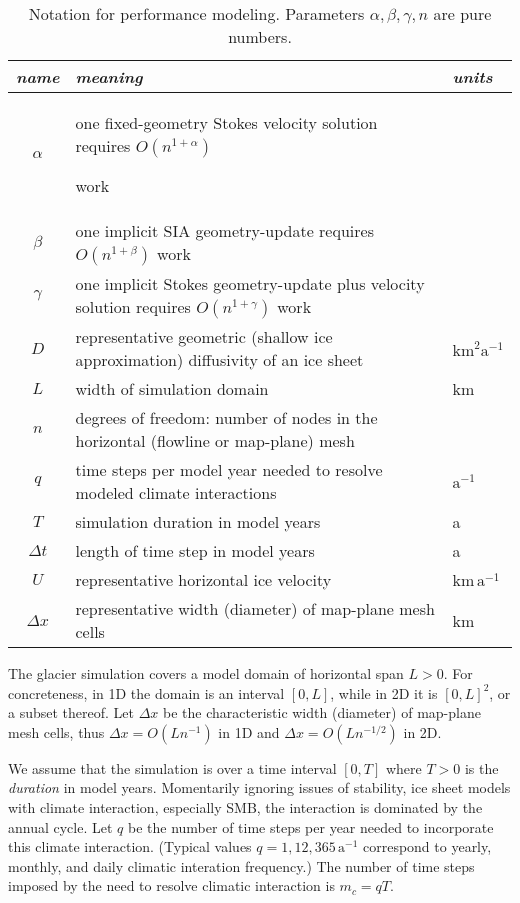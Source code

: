 \documentclass[twocolumn,letterpaper]{igs}
\begin{document}
\begin{table*}[ht]
\begin{tabular}{cll}
\emph{name} & \emph{meaning} & \emph{units} \\ \hline
$\alpha$    & one fixed-geometry Stokes velocity solution requires $O(n^{1+\alpha})${\large \strut} work\\
$\beta$     & one implicit SIA geometry-update requires $O(n^{1+\beta})$ work \\
$\gamma$    & one implicit Stokes geometry-update plus velocity solution requires $O(n^{1+\gamma})$ work \\
$D$         & representative geometric (shallow ice approximation) diffusivity of an ice sheet & $\text{km}^2 \text{a}^{-1}$ \\
$L$         & width of simulation domain & km \\
$n$         & degrees of freedom: number of nodes in the horizontal (flowline or map-plane) mesh \\
$q$         & time steps per model year needed to resolve modeled climate interactions & $\text{a}^{-1}$ \\
$T$         & simulation duration in model years & a \\
$\Delta t$  & length of time step in model years & a \\
$U$         & representative horizontal ice velocity & $\text{km}\,\text{a}^{-1}$ \\
$\Delta x$  & representative width (diameter) of map-plane mesh cells & km
\end{tabular}
\caption{Notation for performance modeling.  Parameters $\alpha,\beta,\gamma,n$ are pure numbers.}
\label{tab:notation}
\end{table*}

The glacier simulation covers a model domain of horizontal span $L>0$.  For concreteness, in 1D the domain is an interval $[0,L]$, while in 2D it is $[0,L]^2$, or a subset thereof.  Let $\Delta x$ be the characteristic width (diameter) of map-plane mesh cells, thus $\Delta x = O(L n^{-1})$ in 1D and $\Delta x = O(L n^{-1/2})$ in 2D.

We assume that the simulation is over a time interval $[0,T]$ where $T>0$ is the \emph{duration} in model years.  Momentarily ignoring issues of stability, ice sheet models with climate interaction, especially SMB, the interaction is dominated by the annual cycle.  Let $q$ be the number of time steps per year needed to incorporate this climate interaction.  (Typical values $q=1,12,365 \,\text{a}^{-1}$ correspond to yearly, monthly, and daily climatic interation frequency.)  The number of time steps imposed by the need to resolve climatic interaction is $m_c=qT$.
\end{document}
